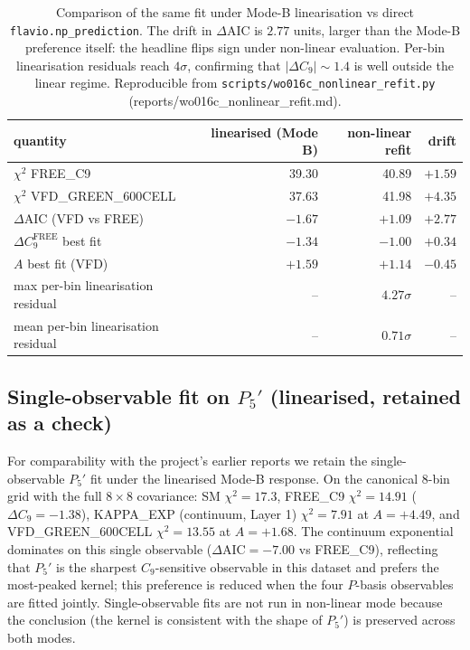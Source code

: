 \begin{table}[h]
\centering
\small
\begin{tabular}{lrrr}
\toprule
quantity & linearised (Mode B) & non-linear refit & drift \\
\midrule
$\chi^{2}$ FREE\_C9                & 39.30 & 40.89 & $+1.59$ \\
$\chi^{2}$ VFD\_GREEN\_600CELL     & 37.63 & 41.98 & $+4.35$ \\
$\Delta\mathrm{AIC}$ (VFD vs FREE) & $-1.67$ & $+1.09$ & $\mathbf{+2.77}$ \\
$\Delta C_{9}^{\mathrm{FREE}}$ best fit & $-1.34$ & $-1.00$ & $+0.34$ \\
$A$ best fit (VFD)                 & $+1.59$ & $+1.14$ & $-0.45$ \\
max per-bin linearisation residual & --  & $4.27\sigma$ & -- \\
mean per-bin linearisation residual & -- & $0.71\sigma$ & -- \\
\bottomrule
\end{tabular}
\caption{Comparison of the same fit under Mode-B linearisation vs
direct \texttt{flavio.np\_prediction}. The drift in
$\Delta\mathrm{AIC}$ is $2.77$ units, larger than the Mode-B
preference itself: the headline flips sign under non-linear
evaluation. Per-bin linearisation residuals reach $4\sigma$,
confirming that $|\Delta C_{9}|\sim 1.4$ is well outside the
linear regime. Reproducible from
\texttt{scripts/wo016c\_nonlinear\_refit.py}
(reports/wo016c\_nonlinear\_refit.md).}
\label{tab:joint_fit_modes}
\end{table}

\subsection{Single-observable fit on $P_{5}'$ (linearised, retained as a check)}

For comparability with the project's earlier reports we retain the
single-observable $P_{5}'$ fit under the linearised Mode-B response.
On the canonical 8-bin grid with the full $8{\times}8$ covariance:
SM $\chi^{2}=17.3$, FREE\_C9 $\chi^{2}=14.91$ ($\Delta C_{9}=-1.38$),
KAPPA\_EXP (continuum, Layer 1) $\chi^{2}=7.91$ at $A=+4.49$, and
VFD\_GREEN\_600CELL $\chi^{2}=13.55$ at $A=+1.68$. The continuum
exponential dominates on this single observable
($\Delta\mathrm{AIC}=-7.00$ vs FREE\_C9), reflecting that $P_{5}'$ is
the sharpest $C_{9}$-sensitive observable in this dataset and prefers
the most-peaked kernel; this preference is reduced when the four
$P$-basis observables are fitted jointly. Single-observable fits are
not run in non-linear mode because the conclusion (the kernel is
consistent with the shape of $P_{5}'$) is preserved across
both modes.

